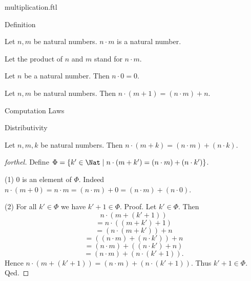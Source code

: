 \documentclass{naproche-library}
\begin{document}
\begin{smodule}[title=Multiplication]{multiplication.ftl}

\begin{sfragment}{Definition}
  \begin{signature}[forthel,id=ARITHMETIC_06_6626346484629504]
    Let $n, m$ be natural numbers.
    $n \cdot m$ is a natural number.

    Let the product of $n$ and $m$ stand for $n \cdot m$.
  \end{signature}

  \begin{axiom}[forthel,id=ARITHMETIC_06_8941041092657152]
    Let $n$ be a natural number.
    Then $n \cdot 0 = 0$.
  \end{axiom}

  \begin{axiom}[forthel,id=ARITHMETIC_06_2211275408932864]
    Let $n, m$ be natural numbers.
    Then $n \cdot (m + 1) = (n \cdot m) + n$.
  \end{axiom}
\end{sfragment}

\begin{sfragment}{Computation Laws}
  \begin{sfragment}{Distributivity}
    \begin{proposition}[forthel,id=ARITHMETIC_06_9001524774567936]
      Let $n, m, k$ be natural numbers.
      Then $n \cdot (m + k) = (n \cdot m) + (n \cdot k)$.
    \end{proposition}
    \begin{proof}[forthel]
      Define $\Phi = \{ k' \in \Nat \mid n \cdot (m + k') = (n \cdot m) + (n \cdot k') \}$.

      (1) $0$ is an element of $\Phi$.
      Indeed $n \cdot (m + 0)
        = n \cdot m
        = (n \cdot m) + 0
        = (n \cdot m) + (n \cdot 0)$.

      (2) For all $k' \in \Phi$ we have $k' + 1 \in \Phi$. \newline
      Proof.
        Let $k'\in \Phi$.
        Then
        \[  n \cdot (m + (k' + 1))                  \]
        \[    = n \cdot ((m + k') + 1)              \]
        \[    = (n \cdot (m + k')) + n              \]
        \[    = ((n \cdot m) + (n \cdot k')) + n    \]
        \[    = (n \cdot m) + ((n \cdot k') + n)    \]
        \[    = (n \cdot m) + (n \cdot (k' + 1)).   \]
        Hence $n \cdot (m + (k' + 1)) = (n \cdot m) + (n \cdot (k' + 1))$.
        Thus $k' + 1 \in \Phi$.
      Qed.


\end{proof}
\end{sfragment}
\end{sfragment}
\end{smodule}
\end{document}
